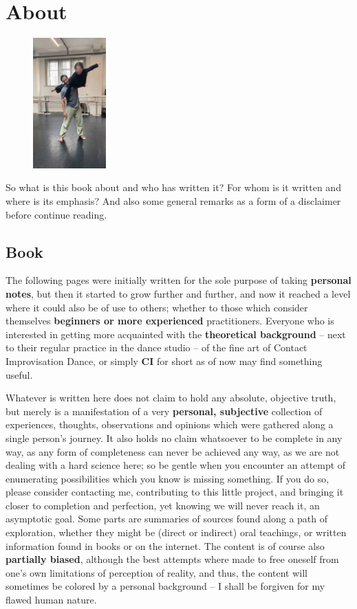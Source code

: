 \chapter{About}\label{ch:about}

\begin{figure}
\centering
\includegraphics[width=0.25\textwidth]{images/about}
\end{figure}

So what is this book about and who has written it?
For whom is it written and where is its emphasis?
And also some general remarks as a form of a disclaimer before continue reading.

\section{Book}\label{sec:book}

The following pages were initially written for the sole purpose of taking \textbf{personal notes}, but then it started to grow further and further, and now it reached a level where it could also be of use to others; whether to those which consider themselves \textbf{beginners or more experienced} practitioners.
Everyone who is interested in getting more acquainted with the \textbf{theoretical background} -- next to their regular practice in the dance studio -- of the fine art of Contact Improvisation Dance, or simply \textbf{CI} for short as of now may find something useful.

Whatever is written here does not claim to hold any absolute, objective truth, but merely is a manifestation of a very \textbf{personal, subjective} collection of experiences, thoughts, observations and opinions which were gathered along a single person's journey.
It also holds no claim whatsoever to be complete in any way, as any form of completeness can never be achieved any way, as we are not dealing with a hard science here; so be gentle when you encounter an attempt of enumerating possibilities which you know is missing something.
If you do so, please consider contacting me, contributing to this little project, and bringing it closer to completion and perfection, yet knowing we will never reach it, an asymptotic goal.
Some parts are summaries of sources found along a path of exploration, whether they might be (direct or indirect) oral teachings, or written information found in books or on the internet.
The content is of course also \textbf{partially biased}, although the best attempts where made to free oneself from one's own limitations of perception of reality, and thus, the content will sometimes be colored by a personal background -- I shall be forgiven for my flawed human nature.

